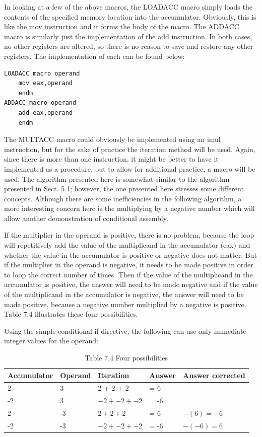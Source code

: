 \documentclass[10pt]{book}
\begin{document}
In looking at a few of the above macros, the LOADACC macro simply loads the contents of the specified memory location into the accumulator. Obviously, this is like the mov instruction and it forms the body of the macro. The ADDACC macro is similarly just the implementation of the add instruction. In both cases, no other registers are altered, so there is no reason to save and restore any other registers. The implementation of each can be found below:

\begin{verbatim}
LOADACC macro operand
    mov eax,operand
    endm
ADDACC macro operand
    add eax,operand
    endm
\end{verbatim}

The MULTACC macro could obviously be implemented using an imul instruction, but for the sake of practice the iteration method will be used. Again, since there is more than one instruction, it might be better to have it implemented as a procedure, but to allow for additional practice, a macro will be used. The algorithm presented here is somewhat similar to the algorithm presented in Sect. 5.1; however, the one presented here stresses some different concepts. Although there are some inefficiencies in the following algorithm, a more interesting concern here is the multiplying by a negative number which will allow another demonstration of conditional assembly.

If the multiplier in the operand is positive, there is no problem, because the loop will repetitively add the value of the multiplicand in the accumulator (eax) and whether the value in the accumulator is positive or negative does not matter. But if the multiplier in the operand is negative, it needs to be made positive in order to loop the correct number of times. Then if the value of the multiplicand in the accumulator is positive, the answer will need to be made negative and if the value of the multiplicand in the accumulator is negative, the answer will need to be made positive, because a negative number multiplied by a negative is positive. Table 7.4 illustrates these four possibilities.

Using the simple conditional if directive, the following can use only immediate integer values for the operand:

\begin{table}[htbp]
\begin{center}
\captionsetup{labelformat=empty}
\caption{Table 7.4 Four possibilities}
\begin{tabular}{|l|l|l|l|l|}
\hline
Accumulator & Operand & Iteration & Answer & Answer corrected \\

\hline
2 & 3 & 2 + 2 + 2 & = 6 &  \\
\hline
-2 & 3 & $-2+-2+-2$ & = -6 &  \\
\hline
2 & -3 & $2+2+2$ & = 6 & $-(6)=-6$ \\
\hline
-2 & -3 & $-2+-2+-2$ & = -6 & $-(-6)=6$ \\
\hline
\end{tabular}
\end{center}
\end{table}
\end{document}
